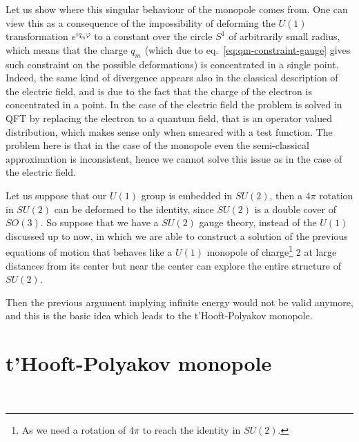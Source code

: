 \documentclass[../main/main.tex]{subfiles}
\begin{document}
\skipline

Let us show where this singular behaviour of the monopole comes from. One can view this as a consequence of the impossibility of deforming the $U(1)$ transformation $e^{iq_m\varphi}$ to a constant over the circle $S^1$ of arbitrarily small radius, which means that the charge $q_m$ (which due to eq.~\eqref{eq:qm-constraint-gauge} gives such constraint on the possible deformations) is concentrated in a single point. Indeed, the same kind of divergence appears also in the classical description of the electric field, and is due to the fact that the charge of the electron is concentrated in a point. In the case of the electric field the problem is solved in QFT by replacing the electron to a quantum field, that is an operator valued distribution, which makes sense only when smeared with a test function. 
The problem here is that  in the case of the monopole even the semi-classical approximation is inconsistent, hence we cannot solve this issue as in the case of the electric field. 

\skipline

Let us suppose that our $U(1)$ group is embedded in $SU(2)$, then a $4\pi$ rotation in $SU(2)$ can be deformed to the identity, since $SU(2)$ is a double cover of $SO(3)$. So suppose that we have a $SU(2)$ gauge theory, instead of the $U(1)$ discussed up to now, in which we are able to construct a solution of the previous equations of motion that behaves like a $U(1)$ monopole of charge\footnote{As we need a rotation of $4\pi$ to reach the identity in $SU(2)$.} 2   at large distances from its center but near the center can explore the entire structure of $SU(2)$. 

Then the previous argument implying infinite energy would not be valid anymore, and this is the basic idea which leads to the t'Hooft-Polyakov monopole. 

\section{t'Hooft-Polyakov monopole}

\cite[Chapter 4]{Shifman:2012}\\
\end{document}
